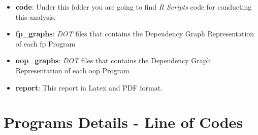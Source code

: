 \documentclass[12pt, a4paper]{article}
\begin{document}
\begin{itemize}
    \item \textbf{code}: Under this folder you are going to find \textit{R Scripts} code for conducting this analysis.
    \item \textbf{fp\_graphs}: \textit{DOT} files that contains the Dependency Graph Representation of each \acrlong{fp} Program
    \item \textbf{oop\_graphs}: \textit{DOT} files that contains the Dependency Graph Representation of each \acrlong{oop} Program
    \item \textbf{report}: This report in Latex and PDF format.
\end{itemize}

\section{Programs Details - Line of Codes}\label{apx:sec:loc}
\end{document}
